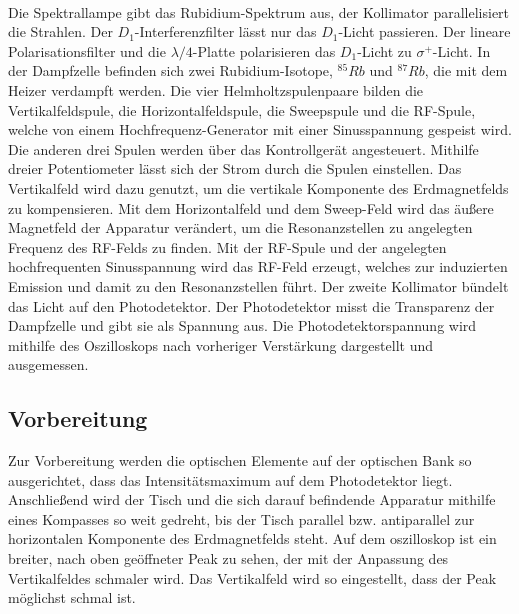 \\Die Spektrallampe gibt das Rubidium-Spektrum aus, der Kollimator parallelisiert die Strahlen.
Der $D_{1}$-Interferenzfilter lässt nur das $D_{1}$-Licht passieren.
Der lineare Polarisationsfilter und die $\lambda/4$-Platte polarisieren das $D_{1}$-Licht zu $\sigma^{+}$-Licht.
In der Dampfzelle befinden sich zwei Rubidium-Isotope, $^{85}Rb$ und $^{87}Rb$, die mit dem Heizer verdampft werden.
Die vier Helmholtzspulenpaare bilden die Vertikalfeldspule, die Horizontalfeldspule, die Sweepspule und die RF-Spule, welche von einem Hochfrequenz-Generator mit einer Sinusspannung gespeist wird.
Die anderen drei Spulen werden über das Kontrollgerät angesteuert.
Mithilfe dreier Potentiometer lässt sich der Strom durch die Spulen einstellen.
Das Vertikalfeld wird dazu genutzt, um die vertikale Komponente des Erdmagnetfelds zu kompensieren.
Mit dem Horizontalfeld und dem Sweep-Feld wird das äußere Magnetfeld der Apparatur verändert, um die Resonanzstellen zu angelegten Frequenz des RF-Felds zu finden.
Mit der RF-Spule und der angelegten hochfrequenten Sinusspannung wird das RF-Feld erzeugt, welches zur induzierten Emission und damit zu den Resonanzstellen führt.
Der zweite Kollimator bündelt das Licht auf den Photodetektor.
Der Photodetektor misst die Transparenz der Dampfzelle und gibt sie als Spannung aus.
Die Photodetektorspannung wird mithilfe des Oszilloskops nach vorheriger Verstärkung dargestellt und ausgemessen.

\subsection{Vorbereitung}
%
%
Zur Vorbereitung werden die optischen Elemente auf der optischen Bank so ausgerichtet, dass das Intensitätsmaximum auf dem Photodetektor liegt.
Anschließend wird der Tisch und die sich darauf befindende Apparatur mithilfe eines Kompasses so weit gedreht, bis der Tisch parallel bzw. antiparallel zur horizontalen Komponente des Erdmagnetfelds steht.
Auf dem oszilloskop ist ein breiter, nach oben geöffneter Peak zu sehen, der mit der Anpassung des Vertikalfeldes schmaler wird.
Das Vertikalfeld wird so eingestellt, dass der Peak möglichst schmal ist.

